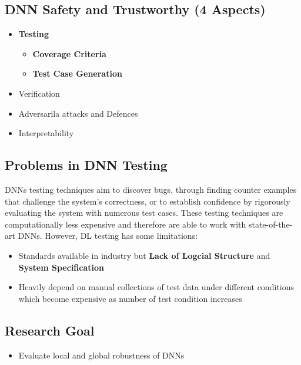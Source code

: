 \documentclass{article}
\begin{document}
\subsection{DNN Safety and Trustworthy (4 Aspects)}

\begin{itemize}

    \item \textbf{Testing} 
    \begin{itemize} %
        \item \textbf{Coverage Criteria}
         \item \textbf{Test Case Generation}
    \end{itemize} %

    \item Verification
     \item Adversarila attacks and Defences
    \item Interpretability

\end{itemize}

\subsection{Problems in DNN Testing}
DNNs testing techniques aim to discover bugs, through finding counter examples that challenge the system's correctness, or to establish confidence by rigorously evaluating the system with numerous test cases. These testing techniques are computationally less expensive and therefore are able to work with state-of-the- art DNNs. However, DL testing has some limitations:
\begin{itemize}
    \item Standards available in industry but \textbf{Lack of Logcial Structure} and \textbf{System Specification}  
     \item Heavily depend on manual collections of test data under different conditions which become expensive as number of test condition increases
\end{itemize}

\subsection{Research Goal}

   \begin{itemize}
     \item Evaluate local and global robustness of DNNs
    \end{itemize}
    
\end{document}
